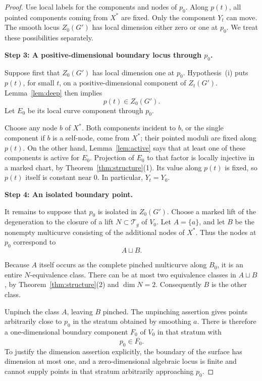 \documentclass[11pt]{article}
\newcommand{\T}{\mathcal T}
\newcommand{\ol}[1]{\overline{#1}}
\theoremstyle{remark}
\begin{document}
\begin{proof}
Use local labels for the components and nodes of \(p_0\).
Along \(p(t)\), all pointed components coming from \(X^\ast\)
are fixed. Only the component \(Y_t\) can move.
The smooth locus \(Z_0(G')\) has local dimension either zero
or one at \(p_0\). We treat these possibilities separately.

\medskip
\noindent\textbf{Step 3: A positive-dimensional boundary locus
through \(p_0\).}

Suppose first that \(Z_0(G')\) has local dimension one at
\(p_0\). Hypothesis~(i) puts \(p(t)\), for small \(t\), on a
positive-dimensional component of \(Z_t(G')\).
Lemma~\ref{lem:deep} then implies
\[
p(t)\in Z_0(G').
\]
Let \(E_0\) be its local curve component through \(p_0\).

Choose any node \(b\) of \(X^\ast\). Both components incident
to \(b\), or the single component if \(b\) is a self-node,
come from \(X^\ast\); their pointed moduli are fixed along
\(p(t)\). On the other hand, Lemma~\ref{lem:active} says that
at least one of these components is active for \(E_0\).
Projection of \(E_0\) to that factor is locally injective in
a marked chart, by Theorem~\ref{thm:structure}(1).
Its value along \(p(t)\) is fixed, so \(p(t)\) itself is
constant near \(0\). In particular, \(Y_t=Y_0\).

\medskip
\noindent\textbf{Step 4: An isolated boundary point.}

It remains to suppose that \(p_0\) is isolated in \(Z_0(G')\).
Choose a marked lift of the degeneration to the closure of
a lift \(N\subset\T_g\) of \(V_0\).
Let \(A=\{a\}\), and let \(B\) be the nonempty multicurve
consisting of the additional nodes of \(X^\ast\).
Thus the nodes at \(p_0\) correspond to
\[
A\sqcup B.
\]

Because \(A\) itself occurs as the complete pinched multicurve
along \(B_0\), it is an entire \(N\)-equivalence class.
There can be at most two equivalence classes in \(A\sqcup B\),
by Theorem~\ref{thm:structure}(2) and \(\dim N=2\).
Consequently \(B\) is the other class.

Unpinch the class \(A\), leaving \(B\) pinched.
The unpinching assertion gives points arbitrarily close to
\(p_0\) in the stratum obtained by smoothing \(a\).
There is therefore a one-dimensional boundary component
\(F_0\) of \(V_0\) in that stratum with
\[
p_0\in\ol{F_0}.
\]
To justify the dimension assertion explicitly, the boundary of
the surface has dimension at most one, and a zero-dimensional
algebraic locus is finite and cannot supply points in that
stratum arbitrarily approaching \(p_0\).



\end{proof}
\end{document}

